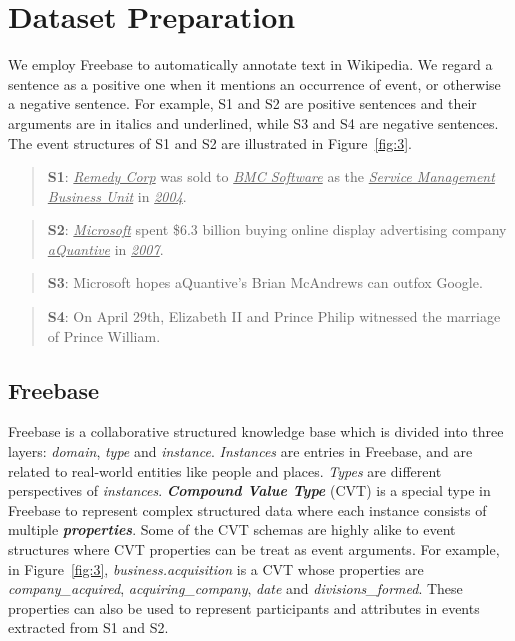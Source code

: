 \section{Dataset Preparation}
We employ Freebase to automatically annotate text in Wikipedia. We regard a sentence as a positive one when it mentions an occurrence of event, or otherwise a negative sentence. For example, S1 and S2 are positive sentences and their arguments are in italics and underlined, while S3 and S4 are negative sentences. The event structures of S1 and S2 are illustrated in Figure~\ref{fig:3}.

\begin{quote}
	\textbf{S1}: \underline{\emph{Remedy Corp}} was sold to \underline{\emph{BMC Software}} as the \underline{\emph{Service Management Business Unit}} in \underline{\emph{2004}}.
\end{quote}
\begin{quote}
	\textbf{S2}: \underline{\emph{Microsoft}} spent \$6.3 billion buying online display advertising company \underline{\emph{aQuantive}} in \underline{\emph{2007}}.
\end{quote}
\begin{quote}
	\textbf{S3}: Microsoft hopes aQuantive's Brian McAndrews can outfox Google.
\end{quote}
\begin{quote}
	\textbf{S4}: On April 29th, Elizabeth II and Prince Philip witnessed the marriage of Prince William.
\end{quote}

\subsection{Freebase}
Freebase\cite{bollacker2008freebase} is a collaborative structured knowledge base which is divided into three layers: \emph{domain}, \emph{type} and \emph{instance}. \emph{Instances} are entries in Freebase, and are related to real-world entities like people and places. \emph{Types} are different perspectives of \emph{instances}. \textbf{\emph{Compound Value Type}} (CVT) is a special type in Freebase to represent complex structured data where each instance consists of multiple \textbf{\emph{properties}}. Some of the CVT schemas are highly alike to event structures where CVT properties can be treat as event arguments. For example, in Figure~\ref{fig:3}, \emph{business.acquisition} is a CVT whose properties are \emph{company\_acquired}, \emph{acquiring\_company}, \emph{date} and \emph{divisions\_formed}. These properties can also be used to represent participants and attributes in events extracted from S1 and S2.

